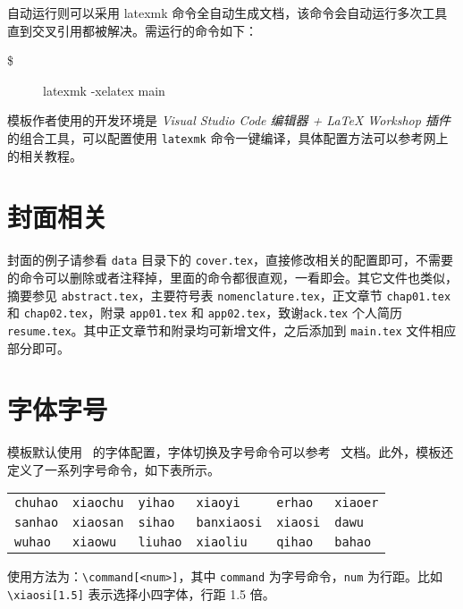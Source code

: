 自动运行则可以采用 latexmk 命令全自动生成文档，该命令会自动运行多次工具直到交叉引用都被解决。需运行的命令如下：
\begin{description}
  \item[\$] latexmk -xelatex main
\end{description}

模板作者使用的开发环境是 \emph{Visual Studio Code 编辑器 + LaTeX Workshop 插件} 的组合工具，可以配置使用 \texttt{latexmk} 命令一键编译，具体配置方法可以参考网上的相关教程。

\section{封面相关}
\label{sec:cover}

封面的例子请参看 \texttt{data} 目录下的 \texttt{cover.tex}，直接修改相关的配置即可，不需要的命令可以删除或者注释掉，里面的命令都很直观，一看即会。其它文件也类似，摘要参见 \texttt{abstract.tex}，主要符号表 \texttt{nomenclature.tex}，正文章节 \texttt{chap01.tex} 和 \texttt{chap02.tex}，附录 \texttt{app01.tex} 和 \texttt{app02.tex}，致谢\texttt{ack.tex} 个人简历 \texttt{resume.tex}。其中正文章节和附录均可新增文件，之后添加到 \texttt{main.tex} 文件相应部分即可。

\section{字体字号}
\label{sec:font}

模板默认使用 \CTeX\ 的字体配置，字体切换及字号命令可以参考 \CTeX\ 文档。此外，模板还定义了一系列字号命令，如下表所示。

\begin{center}
  \begin{tabular}{llllll}
    \toprule
    \texttt{chuhao} & \texttt{xiaochu} & \texttt{yihao}  & \texttt{xiaoyi}    & \texttt{erhao}  & \texttt{xiaoer}\\
    \texttt{sanhao} & \texttt{xiaosan} & \texttt{sihao}  & \texttt{banxiaosi} & \texttt{xiaosi} & \texttt{dawu}\\
    \texttt{wuhao}  & \texttt{xiaowu}  & \texttt{liuhao} & \texttt{xiaoliu}   & \texttt{qihao}  & \texttt{bahao}\\
    \bottomrule
  \end{tabular}
\end{center}

使用方法为：\verb|\command[<num>]|，其中 \texttt{command} 为字号命令，\texttt{num} 为行距。比如 \verb|\xiaosi[1.5]| 表示选择小四字体，行距 1.5 倍。

